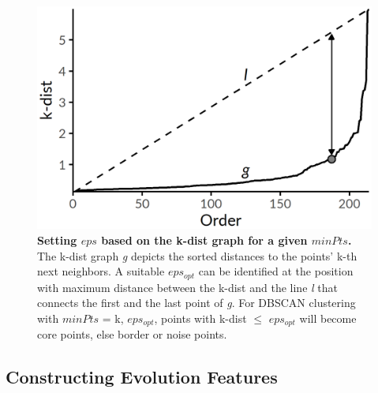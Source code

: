 \documentclass[
  oneside]{book}
\begin{document}
\begin{figure}[htbp]

{\centering \includegraphics[width=0.43\linewidth]{figures/07-k-dist-graph} 

}

\caption{\textbf{Setting \(eps\) based on the k-dist graph for a given \(minPts\).} The k-dist graph \emph{g} depicts the sorted distances to the points' k-th next neighbors. A suitable \(eps_{opt}\) can be identified at the position with maximum distance between the k-dist and the line \emph{l} that connects the first and the last point of \emph{g}. For DBSCAN clustering with \(minPts\) = k, \(eps_{opt}\), points with k-dist \(\leq\) \(eps_{opt}\) will become core points, else border or noise points.}\label{fig:07-k-dist-graph}
\end{figure}

\hypertarget{evo-concept-evo-features}{%
\subsection{Constructing Evolution Features}\label{evo-concept-evo-features}}
\end{document}
